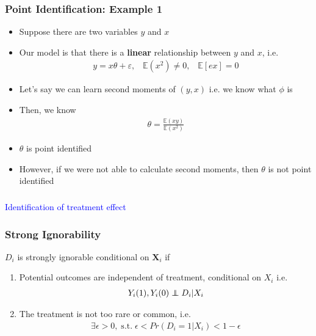 \documentclass{beamer}
\newcommand\independent{\protect\mathpalette{\protect\independenT}{\perp}}
\def\independenT#1#2{\mathrel{\rlap{$#1#2$}\mkern2mu{#1#2}}}
\begin{document}
\begin{frame}
	\frametitle{Point Identification: Example 1}
	\begin{itemize}
		\item Suppose there are two variables $y$ and $x$
		\item Our model is that there is a \textbf{linear} relationship between $y$ and $x$, i.e.
			\begin{align*}
				y = x\theta + \varepsilon, \;\;\; \mathbb E(x^2) \neq 0, \;\;\; \mathbb E[ex] = 0
			\end{align*}
		\item Let's say we can learn second moments of $(y,x)$ i.e. we know what $\phi$ is
		\item Then, we know 
			\begin{align*}
				\theta = \frac{\mathbb E(xy)}{\mathbb E(x^2)}
			\end{align*}
		\item $\theta$ is point identified
		\item However, if we were not able to calculate second moments, then $\theta$ is not point identified
	\end{itemize}
\end{frame}





\begin{frame}
	\frametitle{}
	
	\begin{center}
		\Large\textcolor{blue}{Identification of treatment effect}
	\end{center}
\end{frame}

\begin{frame}
	\frametitle{Strong Ignorability}
	
	\begin{definition}
		$D_i$ is strongly ignorable conditional on $\boldsymbol{X}_i$ if 
		
		\begin{enumerate}
			\item Potential outcomes are independent of treatment, conditional on $X_i$ i.e.
				\begin{align*}
					Y_i(1),  Y_i(0) \independent D_i | X_i
				\end{align*}
			\item The treatment is not too rare or common, i.e.
				\begin{align*}
					\exists \epsilon > 0, \;\text{s.t.} \; \epsilon < Pr(D_i = 1 | X_i) < 1 - \epsilon
				\end{align*}
		\end{enumerate}
	\end{definition}
\end{frame}
\end{document}
